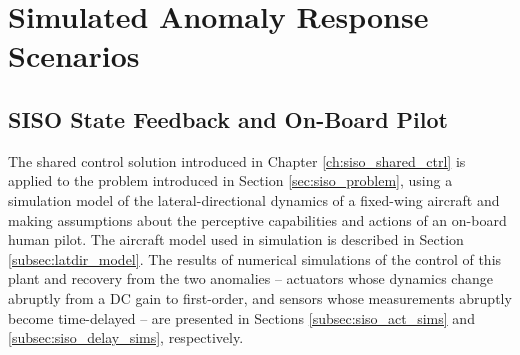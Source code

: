 \chapter{Simulated Anomaly Response Scenarios}  \label{ch:numerical}
\section{SISO State Feedback and On-Board Pilot}

The shared control solution introduced in Chapter \ref{ch:siso_shared_ctrl} is applied to the problem introduced in Section \ref{sec:siso_problem}, using a simulation model of the lateral-directional dynamics of a fixed-wing aircraft and making assumptions about the perceptive capabilities and actions of an on-board human pilot. The aircraft model used in simulation is described in Section \ref{subsec:latdir_model}. The results of numerical simulations of the control of this plant and recovery from the two anomalies -- actuators whose dynamics change abruptly from a DC gain to first-order, and sensors whose measurements abruptly become time-delayed -- are presented in Sections \ref{subsec:siso_act_sims} and \ref{subsec:siso_delay_sims}, respectively.

